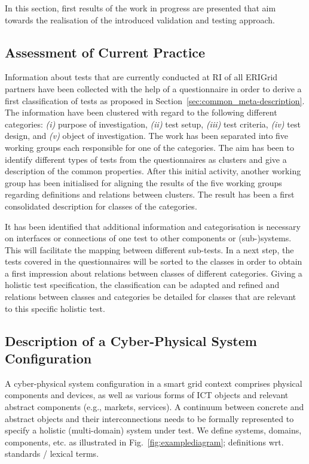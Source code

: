 In this section, first results of the work in progress are presented that aim towards the realisation of the introduced validation and testing approach.

\subsection{Assessment of Current Practice}
Information about tests that are currently conducted at RI of all ERIGrid partners have been collected with the help of a questionnaire in order to derive a first classification of tests as proposed in Section~\ref{sec:common_meta-description}.
The information have been clustered with regard to the following different categories:
\emph{(i)} purpose of investigation, \emph{(ii)} test setup, \emph{(iii)} test criteria, \emph{(iv)} test design, and \emph{(v)} object of investigation.
The work has been separated into five working groups each responsible for one of the categories. The aim has been to identify different types of tests from the questionnaires as clusters and give a description of the common properties.
After this initial activity, another working group has been initialised for aligning the results of the five working groups regarding definitions and relations between clusters. 
The result has been a first consolidated description for classes of the categories.

It has been identified that additional information and categorisation is necessary on interfaces or connections of one test to other components or (sub-)systems. This will facilitate the mapping between different sub-tests.
In a next step, the tests covered in the questionnaires will be sorted to the classes in order to obtain a first impression about relations between classes of different categories.
Giving a holistic test specification, the classification can be adapted and refined and relations between classes and categories be detailed for classes that are relevant to this specific holistic test.

\subsection{Description of a Cyber-Physical System Configuration}\label{subsec:testcasedescription}
A cyber-physical system configuration in a smart grid context comprises physical components and devices, as well as various forms of ICT objects and relevant abstract components (e.g., markets, services). A continuum between concrete and abstract objects and their interconnections needs to be formally represented to specify a holistic (multi-domain) system under test. We define systems, domains, components, etc. as illustrated in Fig.~\ref{fig:examplediagram}; definitions wrt. standards / lexical terms.


